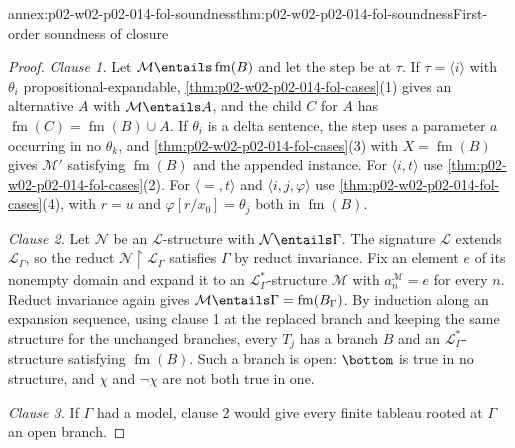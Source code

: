 \begin{annexitem}{annex:p02-w02-p02-014-fol-soundness}{thm:p02-w02-p02-014-fol-soundness}{First-order soundness of closure}
\begin{proof}
\emph{Clause 1.}  Let \(\mathcal M\entails\operatorname{fm}(B)\) and let the step be at
\(\tau\).  If \(\tau=\langle i\rangle\) with \(\theta_i\)
propositional-expandable, \cref{thm:p02-w02-p02-014-fol-cases}(1) gives an
alternative \(A\) with \(\mathcal M\entails A\), and the child \(C\) for \(A\)
has \(\operatorname{fm}(C)=\operatorname{fm}(B)\cup A\).  If \(\theta_i\) is a delta sentence, the step
uses a parameter \(a\) occurring in no \(\theta_k\), and
\cref{thm:p02-w02-p02-014-fol-cases}(3) with \(X=\operatorname{fm}(B)\) gives
\(\mathcal M'\) satisfying \(\operatorname{fm}(B)\) and the appended instance.  For
\(\langle i,t\rangle\) use \cref{thm:p02-w02-p02-014-fol-cases}(2).  For
\(\langle{=},t\rangle\) and \(\langle i,j,\varphi\rangle\) use
\cref{thm:p02-w02-p02-014-fol-cases}(4), with \(r=u\) and
\(\varphi[r/x_0]=\theta_j\) both in \(\operatorname{fm}(B)\).

\emph{Clause 2.}  Let \(\mathcal N\) be an \(\mathcal L\)-structure with
\(\mathcal N\entails\Gamma\).  The signature \(\mathcal L\) extends
\(\mathcal L_{\Gamma}\), so the reduct \(\mathcal N\restriction\mathcal
L_{\Gamma}\) satisfies \(\Gamma\) by reduct invariance.  Fix an element
\(e\) of its nonempty domain and expand it to an
\(\mathcal L_{\Gamma}^{*}\)-structure \(\mathcal M\) with
\(a_n^{\mathcal M}=e\) for every \(n\).  Reduct invariance again gives
\(\mathcal M\entails\Gamma=\operatorname{fm}(B_\Gamma)\).  By induction along an expansion
sequence, using clause 1 at the replaced branch and keeping the same
structure for the unchanged branches, every \(T_j\) has a branch \(B\) and an
\(\mathcal L_{\Gamma}^{*}\)-structure satisfying \(\operatorname{fm}(B)\).  Such a branch
is open: \(\bottom\) is true in no structure, and \(\chi\) and \(\neg\chi\)
are not both true in one.

\emph{Clause 3.}  If \(\Gamma\) had a model, clause 2 would give every finite
tableau rooted at \(\Gamma\) an open branch.
\end{proof}
\end{annexitem}

